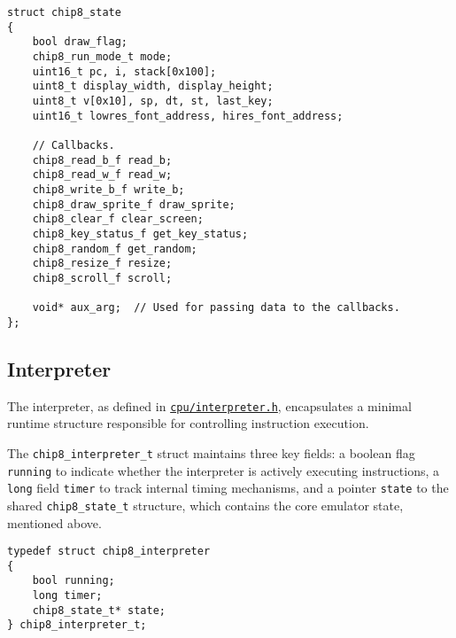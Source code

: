 \begin{verbatim}
struct chip8_state
{
    bool draw_flag;
    chip8_run_mode_t mode;
    uint16_t pc, i, stack[0x100];
    uint8_t display_width, display_height;
    uint8_t v[0x10], sp, dt, st, last_key;
    uint16_t lowres_font_address, hires_font_address;
    
    // Callbacks.
    chip8_read_b_f read_b;
    chip8_read_w_f read_w;
    chip8_write_b_f write_b;
    chip8_draw_sprite_f draw_sprite;
    chip8_clear_f clear_screen;
    chip8_key_status_f get_key_status;
    chip8_random_f get_random;
    chip8_resize_f resize;
    chip8_scroll_f scroll;
    
    void* aux_arg;  // Used for passing data to the callbacks.
};
\end{verbatim}

\subsection{Interpreter}
\label{subsec:ch3sec3sub1}

\par The interpreter, as defined in \href{https://github.com/solomonarul/cchip8/blob/main/inc/cchip8/cpu/interpreter.h}{\texttt{cpu/interpreter.h}}, encapsulates a minimal runtime structure responsible for controlling instruction execution.

\par The \texttt{chip8\_interpreter\_t} struct maintains three key fields: a boolean flag \texttt{running} to indicate whether the interpreter is actively executing instructions, a \texttt{long} field \texttt{timer} to track internal timing mechanisms, and a pointer \texttt{state} to the shared \texttt{chip8\_state\_t} structure, which contains the core emulator state, mentioned above.

\begin{verbatim}
typedef struct chip8_interpreter
{
    bool running;
    long timer;
    chip8_state_t* state;
} chip8_interpreter_t;
\end{verbatim}

